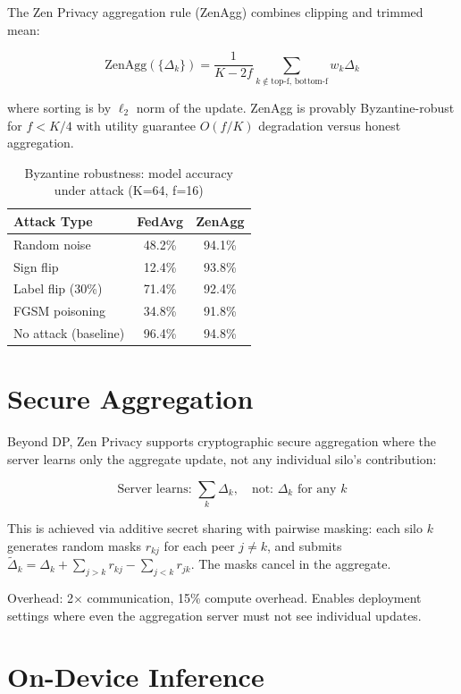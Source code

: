 \documentclass[11pt,a4paper]{article}
\begin{document}
The Zen Privacy aggregation rule (ZenAgg) combines clipping and trimmed mean:

\begin{equation}
\text{ZenAgg}(\{\Delta_k\}) = \frac{1}{K - 2f} \sum_{k \notin \text{top-f, bottom-f}} w_k \Delta_k
\end{equation}

where sorting is by $\ell_2$ norm of the update. ZenAgg is provably Byzantine-robust for $f < K/4$ with utility guarantee $O(f/K)$ degradation versus honest aggregation.

\begin{table}[H]
\centering
\caption{Byzantine robustness: model accuracy under attack (K=64, f=16)}
\label{tab:byzantine}
\begin{tabular}{lcc}
\toprule
Attack Type & FedAvg & ZenAgg \\
\midrule
Random noise & 48.2\% & 94.1\% \\
Sign flip & 12.4\% & 93.8\% \\
Label flip (30\%) & 71.4\% & 92.4\% \\
FGSM poisoning & 34.8\% & 91.8\% \\
No attack (baseline) & 96.4\% & 94.8\% \\
\bottomrule
\end{tabular}
\end{table}

\section{Secure Aggregation}

Beyond DP, Zen Privacy supports cryptographic secure aggregation where the server learns only the aggregate update, not any individual silo's contribution:

\begin{equation}
\text{Server learns: } \sum_k \Delta_k, \quad \text{not: } \Delta_k \text{ for any } k
\end{equation}

This is achieved via additive secret sharing with pairwise masking: each silo $k$ generates random masks $r_{kj}$ for each peer $j \neq k$, and submits $\tilde{\Delta}_k = \Delta_k + \sum_{j>k} r_{kj} - \sum_{j<k} r_{jk}$. The masks cancel in the aggregate.

Overhead: 2$\times$ communication, 15\% compute overhead. Enables deployment settings where even the aggregation server must not see individual updates.

\section{On-Device Inference}
\end{document}

